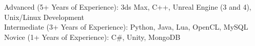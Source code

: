 

\begin{cvparagraph}

Advanced (5+ Years of Experience): 3ds Max, C++, Unreal Engine (3 and 4), Unix/Linux Development \\
Intermediate (3+ Years of Experience): Python, Java, Lua, OpenCL, MySQL \\
Novice (1+ Years of Experience): C\#, Unity, MongoDB
\end{cvparagraph}
